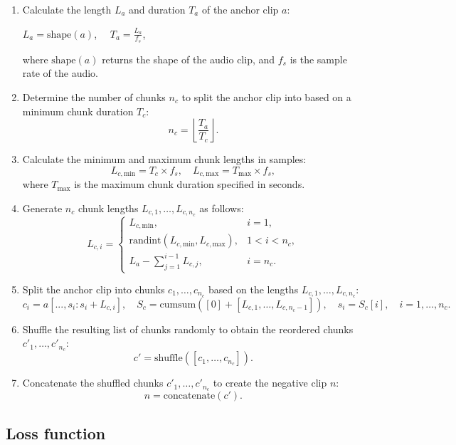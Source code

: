 \begin{enumerate}
\item Calculate the length $L_a$ and duration $T_a$ of the anchor clip $a$:

$L_a = \text{shape}(a)$, $\quad T_a = \frac{L_a}{f_s}$,

where $\text{shape}(a)$ returns the shape of the audio clip, and $f_s$ is the sample rate of the audio.

\item Determine the number of chunks $n_c$ to split the anchor clip into based on a minimum chunk duration $T_c$:
$$
n_c = \left\lfloor\frac{T_a}{T_c}\right\rfloor.
$$

\item Calculate the minimum and maximum chunk lengths in samples:
$$
L_{c,\text{min}} = T_c \times f_s, \quad L_{c,\text{max}} = T_{\text{max}} \times f_s,
$$
where $T_{\text{max}}$ is the maximum chunk duration specified in seconds.

\item Generate $n_c$ chunk lengths $L_{c,1},\ldots,L_{c,n_c}$ as follows:
$$
L_{c,i} = \begin{cases}
L_{c,\text{min}}, & i=1, \\
\text{randint}(L_{c,\text{min}}, L_{c,\text{max}}), & 1<i<n_c, \\
L_a - \sum_{j=1}^{i-1} L_{c,j}, & i=n_c.
\end{cases}
$$

\item Split the anchor clip into chunks $c_1,\ldots,c_{n_c}$ based on the lengths $L_{c,1},\ldots,L_{c,n_c}$:
$$
c_i = a[..., s_i : s_i + L_{c,i}], \quad S_c = \text{cumsum}([0] + [L_{c,1},\ldots,L_{c,n_c-1}]), \quad s_i = S_c[i], \quad i=1,\ldots,n_c.
$$

\item Shuffle the resulting list of chunks randomly to obtain the reordered chunks $c'_1,\ldots,c'_{n_c}$:
$$
c' = \text{shuffle}([c_1,\ldots,c_{n_c}]).
$$

\item Concatenate the shuffled chunks $c'_1,\ldots,c'_{n_c}$ to create the negative clip $n$:
$$
n = \text{concatenate}(c').
$$

\end{enumerate}

\subsection{Loss function}

